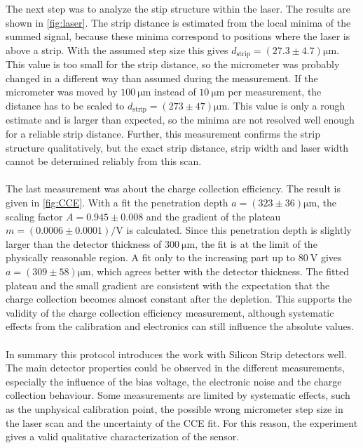 The next step was to analyze the stip structure within the laser. The results are shown in \autoref{fig:laser}. The strip distance is estimated from the local minima of the summed signal, because these minima correspond to positions where the laser is above a strip. With the assumed step size this gives $d_{\text{strip}}=\left(\num{27.3} \pm \num{4.7}\right)\si{\micro\meter}$. This value is too small for the strip distance, so the micrometer was probably changed in a different way than assumed during the measurement. If the micrometer was moved by $\SI{100}{\micro\meter}$ instead of $\SI{10}{\micro\meter}$ per measurement, the distance has to be scaled to $d_{\text{strip}}=\left(\num{273} \pm \num{47}\right)\si{\micro\meter}$. This value is only a rough estimate and is larger than expected, so the minima are not resolved well enough for a reliable strip distance. Further, this measurement confirms the strip structure qualitatively, but the exact strip distance, strip width and laser width cannot be determined reliably from this scan. \\\\
The last measurement was about the charge collection efficiency. The result is given in \autoref{fig:CCE}. With a fit the penetration depth $a = \left(\num{323}\pm\num{36}\right)\si{\micro\meter}$, the scaling factor $A= \num{0.945}\pm\num{0.008}$ and the gradient of the plateau $m=\left(\num{0.0006}\pm\num{0.0001}\right)\si{\per\volt}$ is calculated. Since this penetration depth is slightly larger than the detector thickness of $\SI{300}{\micro\meter}$, the fit is at the limit of the physically reasonable region. A fit only to the increasing part up to $\SI{80}{\volt}$ gives $a=\left(\num{309}\pm\num{58}\right)\si{\micro\meter}$, which agrees better with the detector thickness. The fitted plateau and the small gradient are consistent with the expectation that the charge collection becomes almost constant after the depletion. This supports the validity of the charge collection efficiency measurement, although systematic effects from the calibration and electronics can still influence the absolute values.\\\\
In summary this protocol introduces the work with Silicon Strip detectors well.
The main detector properties could be observed in the different measurements, especially the influence of the bias voltage, the electronic noise and the charge collection behaviour.
Some measurements are limited by systematic effects, such as the unphysical calibration point, the possible wrong micrometer step size in the laser scan and the uncertainty of the CCE fit.
For this reason, the experiment gives a valid qualitative characterization of the sensor.
